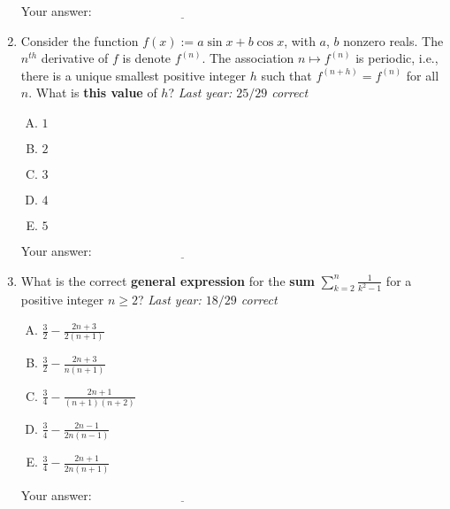 \documentclass[10pt]{amsart}
\begin{document}
\begin{enumerate}
  \vspace{0.1in}
  Your answer: $\underline{\qquad\qquad\qquad\qquad\qquad\qquad\qquad}$
  \vspace{0.2in}

\item Consider the function $f(x) := a \sin x + b \cos x$, with $a$,
  $b$ nonzero reals. The $n^{th}$ derivative of $f$ is denote
  $f^{(n)}$. The association $n \mapsto f^{(n)}$ is periodic, i.e.,
  there is a unique smallest positive integer $h$ such that $f^{(n +
  h)} = f^{(n)}$ for all $n$. What is {\bf this value} of $h$? {\em
  Last year: $25/29$ correct}

  \begin{enumerate}[(A)]
  \item $1$
  \item $2$
  \item $3$
  \item $4$
  \item $5$
  \end{enumerate}

  \vspace{0.1in}
  Your answer: $\underline{\qquad\qquad\qquad\qquad\qquad\qquad\qquad}$
  \vspace{0.2in}

\item What is the correct {\bf general expression} for the {\bf sum}
  $\sum_{k=2}^n \frac{1}{k^2 - 1}$ for a positive integer $n \ge 2$?
  {\em Last year: $18/29$ correct}

  \begin{enumerate}[(A)]
  \item $\frac{3}{2} - \frac{2n + 3}{2(n+1)}$
  \item $\frac{3}{2} - \frac{2n + 3}{n(n+1)}$
  \item $\frac{3}{4} - \frac{2n + 1}{(n + 1)(n+2)}$
  \item $\frac{3}{4} - \frac{2n - 1}{2n(n-1)}$
  \item $\frac{3}{4} - \frac{2n + 1}{2n(n+1)}$
  \end{enumerate}

  \vspace{0.1in}
  Your answer: $\underline{\qquad\qquad\qquad\qquad\qquad\qquad\qquad}$
  \vspace{0.2in}
\end{enumerate}
\end{document}
